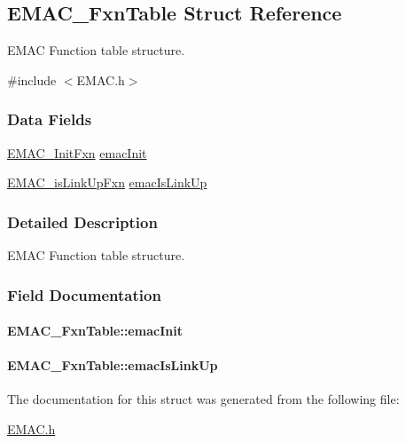 \subsection{E\+M\+A\+C\+\_\+\+Fxn\+Table Struct Reference}
\label{struct_e_m_a_c___fxn_table}


E\+M\+A\+C Function table structure.  




{\ttfamily \#include $<$E\+M\+A\+C.\+h$>$}

\subsubsection*{Data Fields}
\begin{DoxyCompactItemize}
\item 
\hyperlink{_e_m_a_c_8h_a19871b9b03b14b33916f313969f7c275}{E\+M\+A\+C\+\_\+\+Init\+Fxn} \hyperlink{struct_e_m_a_c___fxn_table_ade89cf650288a362483d1facba86e202}{emac\+Init}
\item 
\hyperlink{_e_m_a_c_8h_a16a68c18205d9338eb80ba15d5c503ae}{E\+M\+A\+C\+\_\+is\+Link\+Up\+Fxn} \hyperlink{struct_e_m_a_c___fxn_table_ad8ae1a9c07775132970a31348593c3a6}{emac\+Is\+Link\+Up}
\end{DoxyCompactItemize}


\subsubsection{Detailed Description}
E\+M\+A\+C Function table structure. 

\subsubsection{Field Documentation}
\paragraph[{emac\+Init}]{ E\+M\+A\+C\+\_\+\+Fxn\+Table\+::emac\+Init}\label{struct_e_m_a_c___fxn_table_ade89cf650288a362483d1facba86e202}
\paragraph[{emac\+Is\+Link\+Up}]{ E\+M\+A\+C\+\_\+\+Fxn\+Table\+::emac\+Is\+Link\+Up}\label{struct_e_m_a_c___fxn_table_ad8ae1a9c07775132970a31348593c3a6}


The documentation for this struct was generated from the following file\+:\begin{DoxyCompactItemize}
\item 
\hyperlink{_e_m_a_c_8h}{E\+M\+A\+C.\+h}\end{DoxyCompactItemize}

